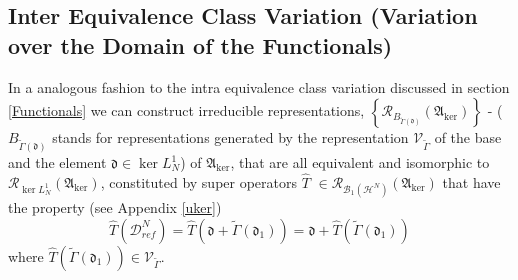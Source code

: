 \documentclass[aps,preprint]{revtex4}%
\begin{document}
\subsection{Inter Equivalence Class Variation (Variation over the Domain of
the Functionals)\label{Inter}}

In a analogous fashion to the intra equivalence class variation discussed in
section \ref{Functionals} we can construct irreducible representations,
$\left\{  \mathcal{R}_{B_{\tilde{\Gamma}\left(  \mathfrak{d}\right)  }}\left(
\mathfrak{A}_{\ker}\right)  \right\}  $ - ($B_{\tilde{\Gamma}\left(
\mathfrak{d}\right)  }$ stands for representations generated by the
representation $\mathcal{V}_{\tilde{\Gamma}}$ of the base and the element
$\mathfrak{d}\in\ker L_{N}^{1}$) of $\mathfrak{A}_{\ker}$, that are all
equivalent and isomorphic to $\mathcal{R}_{\ker L_{N}^{1}}\left(
\mathfrak{A}_{\ker}\right)  $, constituted by super operators $\hat{T}$
$\in\mathcal{R}_{\mathcal{B}_{1}\left(  \mathcal{H}^{N}\right)  }\left(
\mathfrak{A}_{\ker}\right)  $ that have the property (see Appendix
\ref{uker})
\begin{equation}
\hat{T}\left(  \mathcal{D}_{ref}^{N}\right)  =\hat{T}\left(  \mathfrak{d}%
+\tilde{\Gamma}\left(  \mathfrak{d}_{1}\right)  \right)  =\mathfrak{d}+\hat
{T}\left(  \tilde{\Gamma}\left(  \mathfrak{d}_{1}\right)  \right)  \label{SB}%
\end{equation}
where $\hat{T}\left(  \tilde{\Gamma}\left(  \mathfrak{d}_{1}\right)  \right)
\in\mathcal{V}_{\tilde{\Gamma}}$.
\end{document}
